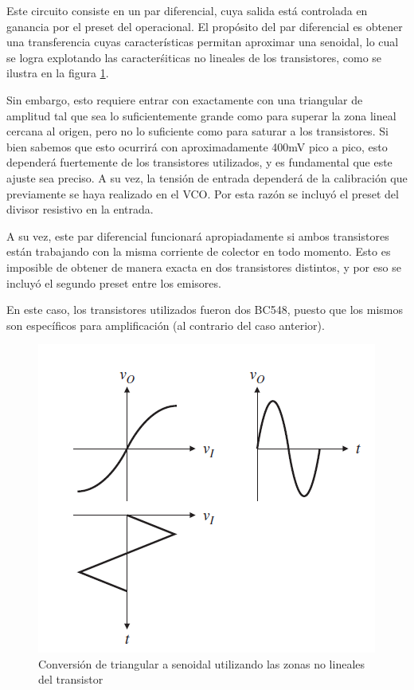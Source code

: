 \documentclass[../../tc_tp6_main.tex]{subfiles}
\begin{document}
Este circuito consiste en un par diferencial, cuya salida est\'a controlada en ganancia por el preset del operacional. El prop\'osito del par diferencial es obtener una transferencia cuyas caracter\'isticas permitan aproximar una senoidal, lo cual se logra explotando las caracter\'siticas no lineales de los transistores, como se ilustra en la figura \ref{fig:curvatransistor}.\par

Sin embargo, esto requiere entrar con exactamente con una triangular de amplitud tal que sea lo suficientemente grande como para superar la zona lineal cercana al origen, pero no lo suficiente como para saturar a los transistores. Si bien sabemos que esto ocurrir\'a con aproximadamente 400mV pico a pico, esto depender\'a fuertemente de los transistores utilizados, y es fundamental que este ajuste sea preciso. A su vez, la tensi\'on de entrada depender\'a de la calibraci\'on que previamente se haya realizado en el VCO. Por esta raz\'on se incluy\'o el preset del divisor resistivo en la entrada. \par

A su vez, este par diferencial funcionar\'a apropiadamente si ambos transistores est\'an trabajando con la misma corriente de colector en todo momento. Esto es imposible de obtener de manera exacta en dos transistores distintos, y por eso se incluy\'o el segundo preset entre los emisores. \par

En este caso, los transistores utilizados fueron dos BC548, puesto que los mismos son espec\'ificos para amplificaci\'on (al contrario del caso anterior).\par 

\begin{figure}
	\centering
	\includegraphics[scale=0.8]{imagenes/triang-sin.png}
	\caption{Conversi\'on de triangular a senoidal utilizando las zonas no lineales del transistor}
	\label{fig:curvatransistor}
\end{figure}
\end{document}
